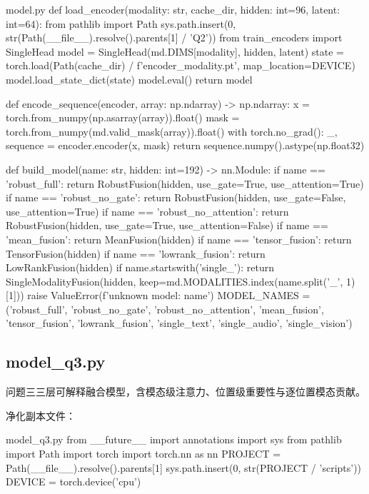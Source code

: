 \documentclass[bwprint]{gmcmthesis}
\begin{document}
\begin{appendices}
\begin{Python}{model.py}
def load_encoder(modality: str, cache_dir, hidden: int=96, latent: int=64):
    from pathlib import Path
    sys.path.insert(0, str(Path(__file__).resolve().parents[1] / 'Q2'))
    from train_encoders import SingleHead
    model = SingleHead(md.DIMS[modality], hidden, latent)
    state = torch.load(Path(cache_dir) / f'encoder_{modality}.pt', map_location=DEVICE)
    model.load_state_dict(state)
    model.eval()
    return model

def encode_sequence(encoder, array: np.ndarray) -> np.ndarray:
    x = torch.from_numpy(np.asarray(array)).float()
    mask = torch.from_numpy(md.valid_mask(array)).float()
    with torch.no_grad():
        _, sequence = encoder.encoder(x, mask)
    return sequence.numpy().astype(np.float32)

def build_model(name: str, hidden: int=192) -> nn.Module:
    if name == 'robust_full':
        return RobustFusion(hidden, use_gate=True, use_attention=True)
    if name == 'robust_no_gate':
        return RobustFusion(hidden, use_gate=False, use_attention=True)
    if name == 'robust_no_attention':
        return RobustFusion(hidden, use_gate=True, use_attention=False)
    if name == 'mean_fusion':
        return MeanFusion(hidden)
    if name == 'tensor_fusion':
        return TensorFusion(hidden)
    if name == 'lowrank_fusion':
        return LowRankFusion(hidden)
    if name.startswith('single_'):
        return SingleModalityFusion(hidden, keep=md.MODALITIES.index(name.split('_', 1)[1]))
    raise ValueError(f'unknown model: {name}')
MODEL_NAMES = ('robust_full', 'robust_no_gate', 'robust_no_attention', 'mean_fusion', 'tensor_fusion', 'lowrank_fusion', 'single_text', 'single_audio', 'single_vision')
\end{Python}

\subsection{model\_q3.py}

问题三三层可解释融合模型，含模态级注意力、位置级重要性与逐位置模态贡献。

净化副本文件：\texttt{}

\begin{Python}{model\_q3.py}
from __future__ import annotations
import sys
from pathlib import Path
import torch
import torch.nn as nn
PROJECT = Path(__file__).resolve().parents[1]
sys.path.insert(0, str(PROJECT / 'scripts'))
DEVICE = torch.device('cpu')


\end{Python}
\end{appendices}
\end{document}
